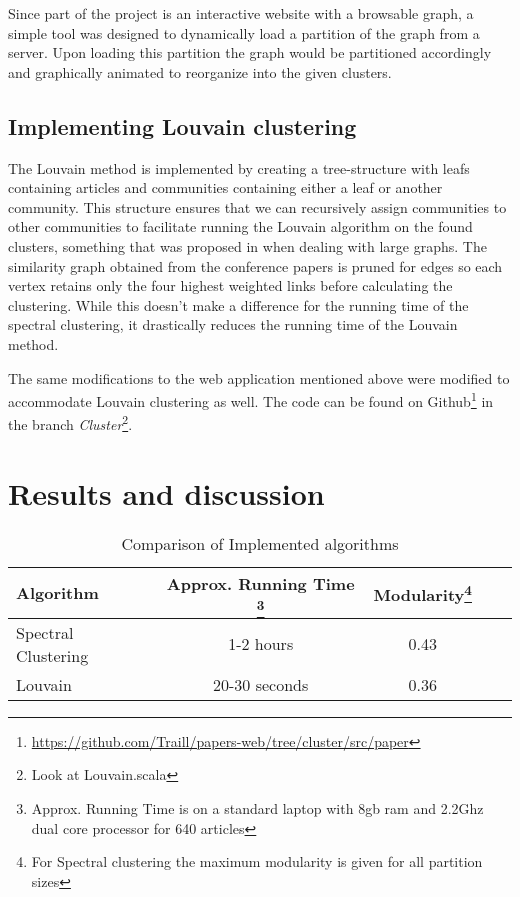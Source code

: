 Since part of the project is an interactive website with a browsable 
graph, a simple tool was designed to dynamically load a partition of the 
graph from a server.  Upon loading this partition the graph would be 
partitioned accordingly and graphically animated to reorganize into the 
given clusters.

\subsection{Implementing Louvain clustering}

The Louvain method is implemented by creating a tree-structure with 
leafs containing articles and communities containing either a leaf or 
another community. This structure ensures that we can recursively assign 
communities to other communities to facilitate running the Louvain 
algorithm on the found clusters, something that was proposed in 
\cite{blondel2008} when dealing with large graphs. The similarity graph 
obtained from the conference papers is pruned for edges so each vertex 
retains only the four highest weighted links before calculating the 
clustering.  While this doesn't make a difference for the running time 
of the spectral clustering, it drastically reduces the running time of 
the Louvain method.

The same modifications to the web application mentioned above were 
modified to accommodate Louvain clustering as well. The code can be 
found on 
Github\footnote{\url{https://github.com/Traill/papers-web/tree/cluster/src/paper}} 
in the branch \emph{Cluster}\footnote{Look at Louvain.scala}.

\section{Results and discussion}

\begin{savenotes}
\begin{table}
	\small
\begin{tabular}{l*{4}{c}}
	Algorithm & Approx. Running Time \footnote{Approx. Running Time is 
	on a standard laptop with 8gb ram and 2.2Ghz dual core processor for 
640 articles}& Modularity\footnote{For Spectral clustering the maximum 
modularity is given for all partition sizes} \\
	\hline
	\noalign{\smallskip} 
	Spectral Clustering & 1-2 hours & 0.43  \\
	Louvain & 20-30 seconds & 0.36 \\
\end{tabular}
\caption{Comparison of Implemented algorithms}
\label{table:stats}
\end{table}
\end{savenotes}

